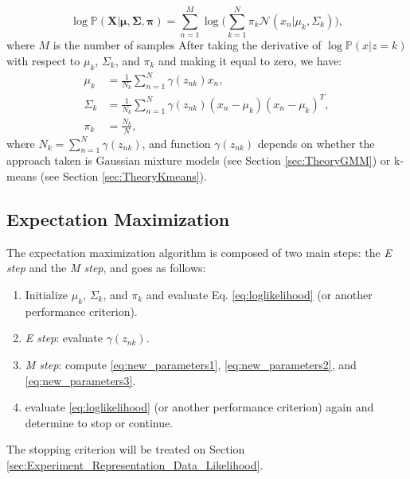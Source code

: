\documentclass[letterpaper, 10 pt, conference]{ieeeconf}  %
\begin{document}
\begin{equation}
\log{\mathbb{P}(\mathbf{X} | \mathbf{\mu, \Sigma, \pi})} = \sum_{n=1}^{M} \log{ \Big( \sum_{k=1}^{N} \pi_{k} \mathcal{N}(x_{n} | \mu_{k},\Sigma_{k}) \Big)},
\label{eq:loglikelihood}
\end{equation}
where $M$ is the number of samples
After taking the derivative of  $\log{\mathbb{P}(x | z= k)}$ with respect to   $\mu_{k}$, $\Sigma_{k}$, and  $\pi_{k}$ and making 
it equal to zero, we have:
\begin{subequations}
\begin{align}
 \mu_{k} &= \frac{1}{N_{k}} \sum_{n=1}^{N} \gamma(z_{nk})x_{n} ,\label{eq:new_parameters1}\\
\Sigma_{k} & = \frac{1}{N_{k}} \sum_{n=1}^{N} \gamma(z_{nk})(x_{n} - \mu_{k})(x_{n} - \mu_{k})^{T},\label{eq:new_parameters2}\\
\pi_{k} &= \frac{N_{k}}{N},\label{eq:new_parameters3}
\end{align}
\end{subequations}
where $N_{k} = \sum_{n=1}^{N} \gamma(z_{nk})$, and function $ \gamma(z_{nk})$ depends on whether the approach taken is Gaussian 
mixture models (see Section \ref{sec:TheoryGMM}) or k-means (see Section \ref{sec:TheoryKmeans}).

\subsection{Expectation Maximization}
\label{sec:TheoryExpectationMaximization}

The expectation maximization algorithm is composed of two main steps: the \emph{E step} and the \emph{M step}, and goes as follows:
\begin{enumerate}
\item Initialize $\mu_{k}$, $\Sigma_{k}$, and  $\pi_{k}$ and evaluate Eq. \ref{eq:loglikelihood} (or another performance criterion).
\item \emph{E step}: evaluate $ \gamma(z_{nk})$.
\item \emph{M step}: compute \ref{eq:new_parameters1}, \ref{eq:new_parameters2}, and \ref{eq:new_parameters3}.
\item evaluate \ref{eq:loglikelihood} (or another performance criterion) again and determine to stop or continue.
\end{enumerate}

The stopping criterion will be treated on Section \ref{sec:Experiment_Representation_Data_Likelihood}.
\end{document}
